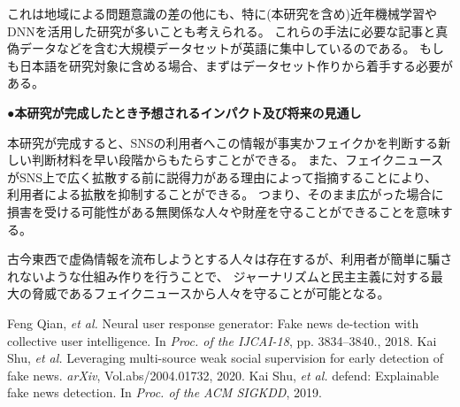 {	これは地域による問題意識の差の他にも、特に(本研究を含め)近年機械学習やDNNを活用した研究が多いことも考えられる。
	これらの手法に必要な記事と真偽データなどを含む大規模データセットが英語に集中しているのである。
	もしも日本語を研究対象に含める場合、まずはデータセット作りから着手する必要がある。

	\noindent
	●\textbf{本研究が完成したとき予想されるインパクト及び将来の見通し}

	本研究が完成すると、SNSの利用者へこの情報が事実かフェイクかを判断する新しい判断材料を早い段階からもたらすことができる。
	また、フェイクニュースがSNS上で広く拡散する前に説得力がある理由によって指摘することにより、
	利用者による拡散を抑制することができる。
	つまり、そのまま広がった場合に損害を受ける可能性がある無関係な人々や財産を守ることができることを意味する。

	古今東西で虚偽情報を流布しようとする人々は存在するが、利用者が簡単に騙されないような仕組み作りを行うことで、
	ジャーナリズムと民主主義に対する最大の脅威であるフェイクニュースから人々を守ることが可能となる。
	
	{\small
		\begin{thebibliography}{99}
			 Feng Qian, \textit{et al.} Neural user response generator: Fake news de-tection with collective user intelligence. In \textit{Proc. of the IJCAI-18}, pp. 3834–3840., 2018.
			 Kai Shu, \textit{et al.} Leveraging multi-source weak social supervision for early detection of fake news. \textit{arXiv}, Vol.abs/2004.01732, 2020.
			 Kai Shu, \textit{et al.} defend: Explainable fake news detection. In \textit{Proc. of the ACM SIGKDD}, 2019.
		\end{thebibliography}
	}
}

